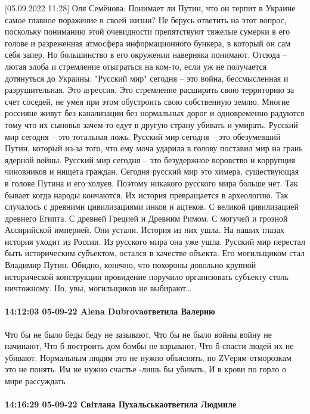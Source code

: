 [05.09.2022 11:28] Оля Семёнова: Понимает ли Путин, что он терпит в Украине самое главное поражение в своей жизни? Не берусь ответить на этот вопрос, поскольку пониманию этой очевидности препятствуют тяжелые сумерки в его голове и разреженная атмосфера информационного бункера, в который он сам себя запер. Но большинство в его окружении наверняка понимают. Отсюда – лютая злоба и стремление отыграться на ком-то, если уж не получается дотянуться до Украины. "Русский мир" сегодня – это война, бессмысленная и разрушительная. Это агрессия. Это стремление расширить свою территорию за счет соседей, не умея при этом обустроить свою собственную землю. Многие россияне живут без канализации без нормальных дорог и одновременно радуются тому что их сыновья зачем-то едут в другую страну убивать и умирать.
Русский мир сегодня – это тотальная ложь.
Русский мир сегодня – это обезумевший Путин, который из-за того, что ему моча ударила в голову поставил мир на грань ядерной войны.
Русский мир сегодня – это безудержное воровство и коррупция чиновников и нищета граждан.
Сегодня русский мир это химера, существующая в голове Путина и его холуев.
Поэтому никакого русского мира больше нет. Так бывает когда народы кончаются. Их история превращается в археологию. Так случалось с древними цивилизациями инков и ацтеков. С великой цивилизацией древнего Египта. С древней Грецией и Древним Римом. С могучей и грозной Ассирийской империей. Они устали. История из них ушла. На наших глазах история уходит из России. Из русского мира она уже ушла. Русский мир перестал быть историческим субъектом, остался в качестве объекта.
Его могильщиком стал Владимир Путин. Обидно, конечно, что похороны довольно крупной исторической конструкции провидение поручило организовать субъекту столь ничтожному. Но, увы, могильщиков не выбирают…


\paragraph{14:12:03 05-09-22 Alena Dubrovaответила Валерию}

Что бы не было беды беду не зазывают,
Что бы не было войны войну не начинают,
Что б построить дом бомбы не взрывают,
Что б спасти людей их не убивают.
Нормальным людям это не нужно объяснять,
но ZVерям-отморозкам это не понять.
Им не нужно счастье -лишь бы убивать,
И в крови по горло о мире рассуждать


\paragraph{14:16:29 05-09-22 Свiтлана Пухальськаответила Людмиле}

